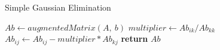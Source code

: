 \documentclass{article}
\begin{document}
  \begin{algorithm}
    \caption{Simple Gaussian Elimination}
    \begin{algorithmic}[1]
        \State $Ab \gets augmentedMatrix(A,\ b)$
            \State $multiplier \gets Ab_{ik} / Ab_{kk}$
              \State $Ab_{ij} \gets Ab_{ij} - multiplier * Ab_{kj}$
            \EndFor
          \EndFor
        \EndFor
        \State \textbf{return} $Ab$
      \EndProcedure
    \end{algorithmic}
  \end{algorithm}
\end{document}
